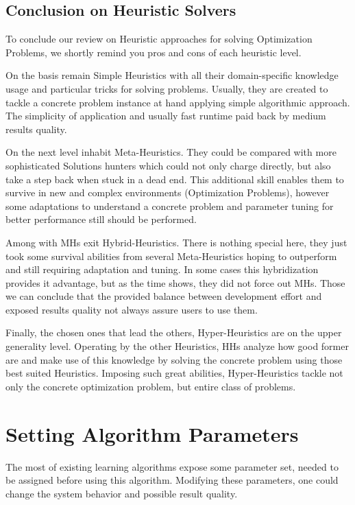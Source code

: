 \subsection{Conclusion on Heuristic Solvers}
To conclude our review on Heuristic approaches for solving Optimization Problems, we shortly remind you pros and cons of each heuristic level.

On the basis remain Simple Heuristics with all their domain-specific knowledge usage and particular tricks for solving problems. Usually, they are created to tackle a concrete problem instance at hand applying simple algorithmic approach. The simplicity of application and usually fast runtime paid back by medium results quality.

On the next level inhabit Meta-Heuristics. They could be compared with more sophisticated Solutions hunters which could not only charge directly, but also take a step back when stuck in a dead end. This additional skill enables them to survive in new and complex environments (Optimization Problems), however some adaptations to understand a concrete problem and parameter tuning for better performance still should be performed.

Among with MHs exit Hybrid-Heuristics. There is nothing special here, they just took some survival abilities from several Meta-Heuristics hoping to outperform and still requiring adaptation and tuning. In some cases this hybridization provides it advantage, but as the time shows, they did not force out MHs. Those we can conclude that the provided balance between development effort and exposed results quality not always assure users to use them.

Finally, the chosen ones that lead the others, Hyper-Heuristics are on the upper generality level. 
Operating by the other Heuristics, HHs analyze how good former are and make use of this knowledge by solving the concrete problem using those best suited Heuristics. Imposing such great abilities, Hyper-Heuristics tackle not only the concrete optimization problem, but entire class of problems.


\section{Setting Algorithm Parameters}\label{bg: section Parameters Setting}
The most of existing learning algorithms expose some parameter set, needed to be assigned before using this algorithm. Modifying these parameters, one could change the system behavior and possible result quality.

